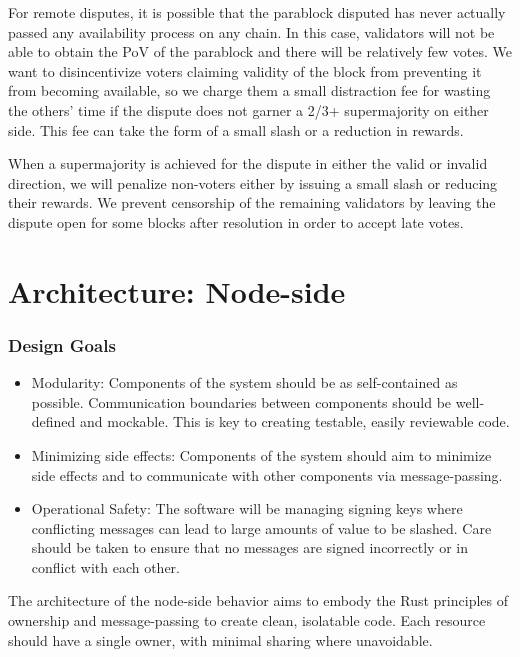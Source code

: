 For remote disputes, it is possible that the parablock disputed has never
actually passed any availability process on any chain. In this case, validators
will not be able to obtain the PoV of the parablock and there will be relatively
few votes. We want to disincentivize voters claiming validity of the block from
preventing it from becoming available, so we charge them a small distraction fee
for wasting the others' time if the dispute does not garner a 2/3+ supermajority
on either side. This fee can take the form of a small slash or a reduction in
rewards.
\newline

When a supermajority is achieved for the dispute in either the valid or invalid
direction, we will penalize non-voters either by issuing a small slash or
reducing their rewards. We prevent censorship of the remaining validators by
leaving the dispute open for some blocks after resolution in order to accept
late votes.

\section{Architecture: Node-side}

\subsubsection{Design Goals}

\begin{itemize}
    \item Modularity: Components of the system should be as self-contained as
    possible. Communication boundaries between components should be well-defined
    and mockable. This is key to creating testable, easily reviewable code.
    \item Minimizing side effects: Components of the system should aim to
    minimize side effects and to communicate with other components via
    message-passing.
    \item Operational Safety: The software will be managing signing keys where
    conflicting messages can lead to large amounts of value to be slashed. Care
    should be taken to ensure that no messages are signed incorrectly or in
    conflict with each other.
\end{itemize}

The architecture of the node-side behavior aims to embody the Rust principles of
ownership and message-passing to create clean, isolatable code. Each resource
should have a single owner, with minimal sharing where unavoidable.
\newline

